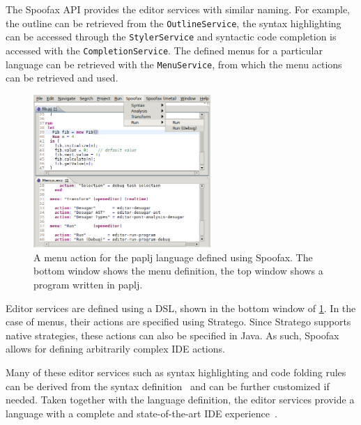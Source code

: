 The Spoofax API provides the editor services with similar naming. For
example, the outline can be retrieved from the \texttt{OutlineService}, the
syntax highlighting can be accessed through the \texttt{StylerService} and
syntactic code completion is accessed with the
\texttt{CompletionService}. The defined menus for a particular language can
be retrieved with the \texttt{MenuService}, from which the menu actions can
be retrieved and used.

\begin{figure}[htb]
\centering
\includegraphics[width=0.6\textwidth]{./img/menu-actions.png}
\caption{\label{fig:a-menu-actions}
A menu action for the paplj language defined using Spoofax. The bottom window shows the menu definition, the top window shows a program written in paplj.}
\end{figure}

Editor services are defined using a DSL, shown in the bottom window of
\cref{fig:a-menu-actions}. In the case of menus, their actions are
specified using Stratego. Since Stratego supports native strategies,
these actions can also be specified in Java. As such, Spoofax allows
for defining arbitrarily complex IDE actions.

Many of these editor services such as syntax highlighting and code
folding rules can be derived from the syntax
definition~\cite{Kats10c} and can be further customized if
needed. Taken together with the language definition, the editor
services provide a language with a complete and state-of-the-art IDE
experience~\cite{Kats10a}.
